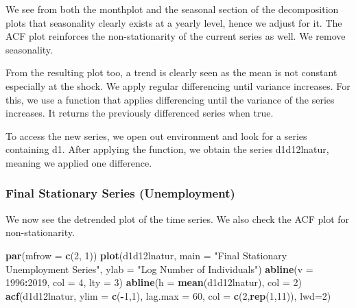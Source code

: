 \documentclass[
]{article}
\newenvironment{Shaded}{\begin{snugshade}}{\end{snugshade}}
\newcommand{\AttributeTok}[1]{\textcolor[rgb]{0.13,0.29,0.53}{#1}}
\newcommand{\DecValTok}[1]{\textcolor[rgb]{0.00,0.00,0.81}{#1}}
\newcommand{\FunctionTok}[1]{\textcolor[rgb]{0.13,0.29,0.53}{\textbf{#1}}}
\newcommand{\NormalTok}[1]{#1}
\newcommand{\SpecialCharTok}[1]{\textcolor[rgb]{0.81,0.36,0.00}{\textbf{#1}}}
\newcommand{\StringTok}[1]{\textcolor[rgb]{0.31,0.60,0.02}{#1}}
\begin{document}
We see from both the monthplot and the seasonal section of the
decomposition plots that seasonality clearly exists at a yearly level,
hence we adjust for it. The ACF plot reinforces the non-stationarity of
the current series as well. We remove seasonality.

From the resulting plot too, a trend is clearly seen as the mean is not
constant especially at the shock. We apply regular differencing until
variance increases. For this, we use a function that applies
differencing until the variance of the series increases. It returns the
previously differenced series when true.

To access the new series, we open out environment and look for a series
containing d1. After applying the function, we obtain the series
d1d12lnatur, meaning we applied one difference.

\subsubsection{Final Stationary Series
(Unemployment)}\label{final-stationary-series-unemployment}

We now see the detrended plot of the time series. We also check the ACF
plot for non-stationarity.

\begin{Shaded}
\begin{Highlighting}[]
\FunctionTok{par}\NormalTok{(}\AttributeTok{mfrow =} \FunctionTok{c}\NormalTok{(}\DecValTok{2}\NormalTok{, }\DecValTok{1}\NormalTok{))}
\FunctionTok{plot}\NormalTok{(d1d12lnatur,}
\AttributeTok{main =} \StringTok{"Final Stationary Unemployment Series"}\NormalTok{,}
\AttributeTok{ylab =} \StringTok{"Log Number of Individuals"}\NormalTok{)}
\FunctionTok{abline}\NormalTok{(}\AttributeTok{v =} \DecValTok{1996}\SpecialCharTok{:}\DecValTok{2019}\NormalTok{, }\AttributeTok{col =} \DecValTok{4}\NormalTok{, }\AttributeTok{lty =} \DecValTok{3}\NormalTok{)}
\FunctionTok{abline}\NormalTok{(}\AttributeTok{h =} \FunctionTok{mean}\NormalTok{(d1d12lnatur), }\AttributeTok{col =} \DecValTok{2}\NormalTok{)}
\FunctionTok{acf}\NormalTok{(d1d12lnatur, }\AttributeTok{ylim =} \FunctionTok{c}\NormalTok{(}\SpecialCharTok{{-}}\DecValTok{1}\NormalTok{,}\DecValTok{1}\NormalTok{), }\AttributeTok{lag.max =} \DecValTok{60}\NormalTok{, }\AttributeTok{col =} \FunctionTok{c}\NormalTok{(}\DecValTok{2}\NormalTok{,}\FunctionTok{rep}\NormalTok{(}\DecValTok{1}\NormalTok{,}\DecValTok{11}\NormalTok{)), }\AttributeTok{lwd=}\DecValTok{2}\NormalTok{)}
\end{Highlighting}
\end{Shaded}
\end{document}
